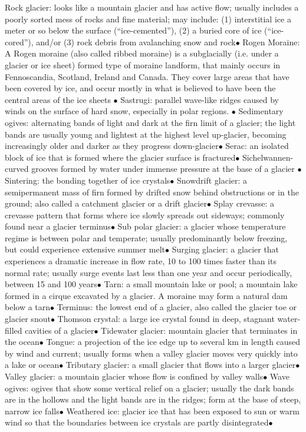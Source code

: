 \documentclass{article}
\newcommand{\ddd}{$\bullet$}
\begin{document}
\begin{multicols*}{4}
        Rock glacier: looks like a mountain glacier and has active flow; usually includes a poorly sorted mess of rocks and fine material; may include: (1) interstitial ice a meter or so below the surface (“ice-cemented”), (2) a buried core of ice (“ice-cored”), and/or (3) rock debris from avalanching snow and rock\ddd
        Rogen Moraine: A Rogen moraine (also called ribbed moraine) is a subglacially (i.e. under a glacier or ice sheet) formed type of moraine landform, that mainly occurs in Fennoscandia, Scotland, Ireland and Canada. They cover large areas that have been covered by ice, and occur mostly in what is believed to have been the central areas of the ice sheets \ddd
        Sastrugi: parallel wave-like ridges caused by winds on the surface of hard snow, especially in polar regions. \ddd
        Sedimentary ogives: alternating bands of light and dark at the firn limit of a glacier; the light bands are usually young and lightest at the highest level up-glacier, becoming increasingly older and darker as they progress down-glacier\ddd
        Serac: an isolated block of ice that is formed where the glacier surface is fractured\ddd
        Sichelwannen- curved grooves formed by water under immense pressure at the base of a glacier \ddd
        Sintering: the bonding together of ice crystals\ddd
        Snowdrift glacier: a semipermanent mass of firn formed by drifted snow behind obstructions or in the ground; also called a catchment glacier or a drift glacier\ddd
        Splay crevasse: a crevasse pattern that forms where ice slowly spreads out sideways; commonly found near a glacier terminus\ddd
        Sub polar glacier: a glacier whose temperature regime is between polar and temperate; usually predominantly below freezing, but could experience extensive summer melt\ddd
        Surging glacier: a glacier that experiences a dramatic increase in flow rate, 10 to 100 times faster than its normal rate; usually surge events last less than one year and occur periodically, between 15 and 100 years\ddd
        Tarn: a small mountain lake or pool; a mountain lake formed in a cirque excavated by a glacier. A moraine may form a natural dam below a tarn\ddd
        Terminus: the lowest end of a glacier, also called the glacier toe or glacier snout\ddd
        Thomson crystal: a large ice crystal found in deep, stagnant water-filled cavities of a glacier\ddd
        Tidewater glacier: mountain glacier that terminates in the ocean\ddd
        Tongue: a projection of the ice edge up to several km in length caused by wind and current; usually forms when a valley glacier moves very quickly into a lake or ocean\ddd
        Tributary glacier: a small glacier that flows into a larger glacier\ddd
        Valley glacier: a mountain glacier whose flow is confined by valley walls\ddd
        Wave ogives: ogives that show some vertical relief on a glacier; usually the dark bands are in the hollows and the light bands are in the ridges; form at the base of steep, narrow ice falls\ddd
        Weathered ice: glacier ice that has been exposed to sun or warm wind so that the boundaries between ice crystals are partly disintegrated\ddd
	   	
	\end{multicols*}
\end{document}
